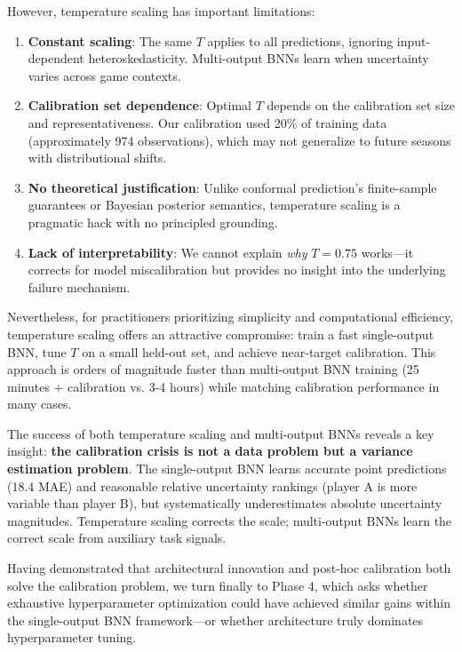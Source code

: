 However, temperature scaling has important limitations:

\begin{enumerate}
    \item \textbf{Constant scaling}: The same $T$ applies to all predictions, ignoring input-dependent heteroskedasticity. Multi-output BNNs learn when uncertainty varies across game contexts.
    \item \textbf{Calibration set dependence}: Optimal $T$ depends on the calibration set size and representativeness. Our calibration used 20\% of training data (approximately 974 observations), which may not generalize to future seasons with distributional shifts.
    \item \textbf{No theoretical justification}: Unlike conformal prediction's finite-sample guarantees or Bayesian posterior semantics, temperature scaling is a pragmatic hack with no principled grounding.
    \item \textbf{Lack of interpretability}: We cannot explain \textit{why} $T=0.75$ works—it corrects for model miscalibration but provides no insight into the underlying failure mechanism.
\end{enumerate}

Nevertheless, for practitioners prioritizing simplicity and computational efficiency, temperature scaling offers an attractive compromise: train a fast single-output BNN, tune $T$ on a small held-out set, and achieve near-target calibration. This approach is orders of magnitude faster than multi-output BNN training (25 minutes + calibration vs. 3-4 hours) while matching calibration performance in many cases.

The success of both temperature scaling and multi-output BNNs reveals a key insight: \textbf{the calibration crisis is not a data problem but a variance estimation problem}. The single-output BNN learns accurate point predictions (18.4 MAE) and reasonable relative uncertainty rankings (player A is more variable than player B), but systematically underestimates absolute uncertainty magnitudes. Temperature scaling corrects the scale; multi-output BNNs learn the correct scale from auxiliary task signals.

Having demonstrated that architectural innovation and post-hoc calibration both solve the calibration problem, we turn finally to Phase 4, which asks whether exhaustive hyperparameter optimization could have achieved similar gains within the single-output BNN framework—or whether architecture truly dominates hyperparameter tuning.

